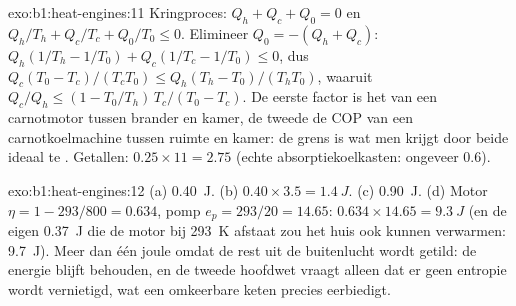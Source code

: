 \begin{solution}{exo:b1:heat-engines:11}
Kringproces: $Q_h + Q_c + Q_0 = 0$ en $Q_h/T_h + Q_c/T_c + Q_0/T_0 \leq 0$.
Elimineer $Q_0 = -(Q_h + Q_c)$: $Q_h(1/T_h - 1/T_0) + Q_c(1/T_c - 1/T_0) \leq 0$,
dus $Q_c(T_0 - T_c)/(T_cT_0) \leq Q_h(T_h - T_0)/(T_hT_0)$, waaruit
$Q_c/Q_h \leq (1 - T_0/T_h)\,T_c/(T_0 - T_c)$. De eerste factor is het
 van een carnotmotor tussen brander en kamer, de tweede de
COP van een carnotkoelmachine tussen ruimte en kamer: de grens is wat
men krijgt door beide ideaal te . Getallen: $0.25 \times 11 = 2.75$
(echte absorptiekoelkasten: ongeveer $0.6$).
\end{solution}

\begin{solution}{exo:b1:heat-engines:12}
(a) \qty{0.40}{J}. (b) $0.40 \times 3.5 = \qty{1.4}{J}$. (c) \qty{0.90}{J}.
(d) Motor $\eta = 1 - 293/800 = 0.634$, pomp $e_p = 293/20 = 14.65$:
$0.634 \times 14.65 = \qty{9.3}{J}$ (en de eigen \qty{0.37}{J} die de motor
bij \qty{293}{K} afstaat zou het huis ook kunnen verwarmen: \qty{9.7}{J}). Meer dan
één joule omdat de rest uit de buitenlucht wordt getild: de energie blijft
behouden, en de tweede hoofdwet vraagt alleen dat er geen entropie wordt vernietigd,
wat een omkeerbare keten precies eerbiedigt.
\end{solution}

